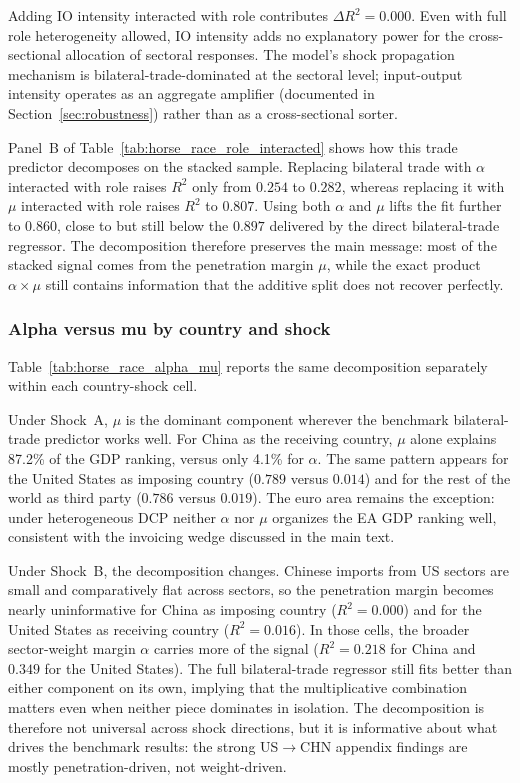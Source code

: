 Adding IO intensity interacted with role contributes $\Delta R^2 = 0.000$. Even with full role heterogeneity allowed, IO intensity adds no explanatory power for the cross-sectional allocation of sectoral responses. The model's shock propagation mechanism is bilateral-trade-dominated at the sectoral level; input-output intensity operates as an aggregate amplifier (documented in Section~\ref{sec:robustness}) rather than as a cross-sectional sorter.

Panel~B of Table~\ref{tab:horse_race_role_interacted} shows how this trade predictor decomposes on the stacked sample. Replacing bilateral trade with $\alpha$ interacted with role raises $R^2$ only from $0.254$ to $0.282$, whereas replacing it with $\mu$ interacted with role raises $R^2$ to $0.807$. Using both $\alpha$ and $\mu$ lifts the fit further to $0.860$, close to but still below the $0.897$ delivered by the direct bilateral-trade regressor. The decomposition therefore preserves the main message: most of the stacked signal comes from the penetration margin $\mu$, while the exact product $\alpha \times \mu$ still contains information that the additive split does not recover perfectly.

\subsubsection*{Alpha versus mu by country and shock}

Table~\ref{tab:horse_race_alpha_mu} reports the same decomposition separately within each country-shock cell.



Under Shock~A, $\mu$ is the dominant component wherever the benchmark bilateral-trade predictor works well. For China as the receiving country, $\mu$ alone explains 87.2\% of the GDP ranking, versus only 4.1\% for $\alpha$. The same pattern appears for the United States as imposing country ($0.789$ versus $0.014$) and for the rest of the world as third party ($0.786$ versus $0.019$). The euro area remains the exception: under heterogeneous DCP neither $\alpha$ nor $\mu$ organizes the EA GDP ranking well, consistent with the invoicing wedge discussed in the main text.

Under Shock~B, the decomposition changes. Chinese imports from US sectors are small and comparatively flat across sectors, so the penetration margin becomes nearly uninformative for China as imposing country ($R^2 = 0.000$) and for the United States as receiving country ($R^2 = 0.016$). In those cells, the broader sector-weight margin $\alpha$ carries more of the signal ($R^2 = 0.218$ for China and $0.349$ for the United States). The full bilateral-trade regressor still fits better than either component on its own, implying that the multiplicative combination matters even when neither piece dominates in isolation. The decomposition is therefore not universal across shock directions, but it is informative about what drives the benchmark results: the strong US$\to$CHN appendix findings are mostly penetration-driven, not weight-driven.

